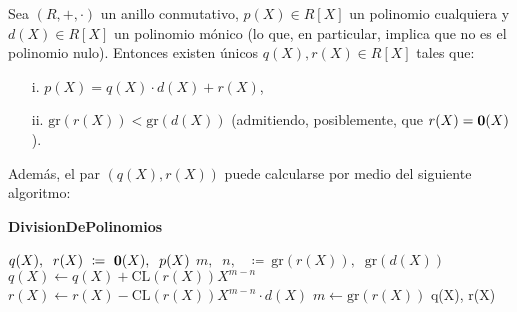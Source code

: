 \begin{proposition} \label{div_polinomios}
Sea $(R, +, \cdot)$ un anillo conmutativo, ${p(X) \in R[X]}$ un polinomio cualquiera y $d(X) \in R[X]$ un polinomio mónico (lo que, en particular, implica que no es el polinomio nulo). Entonces existen únicos $q(X), r(X) \in R[X]$ tales que:
\begin{itemize}
\item[i.] $p(X) = q(X) \cdot d(X) + r(X)$,
\item[ii.] $\mathrm{gr}(r(X)) < \mathrm{gr}(d(X))$ (admitiendo, posiblemente, que $r(X) = \mathbf{0}(X)$). 
\end{itemize}
Además, el par $(q(X), r(X))$ puede calcularse por medio del siguiente algoritmo:
\begin{algorithm}[H]
    \caption{\quad\textbf{DivisionDePolinomios}}
    \label{alg_division_polinomios}
    \begin{algorithmic}[1]
        \STATE $q(X),\;\; r(X) \ \coloneqq \ \mathbf{0}(X),\;\; p(X)$
        \STATE $m,\;\; n,\;\; \ \coloneqq \ \mathrm{gr}(r(X)),\;\; \mathrm{gr}(d(X))$
            \STATE $q(X) \gets q(X) + \mathrm{CL}(r(X)) X^{m-n}$ 
            \STATE $r(X) \gets r(X) - \mathrm{CL}(r(X)) X^{m-n} \cdot d(X)$
            \STATE $m \gets \mathrm{gr}(r(X))$
        \ENDWHILE
        \RETURN q(X),\;\; r(X)
    \end{algorithmic}
    \end{algorithm}
\end{proposition}



